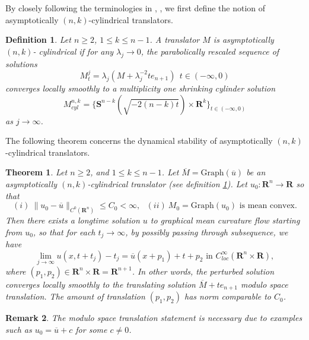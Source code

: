 \documentclass[pdflatex,sn-mathphys-num]{sn-jnl}%
\newtheorem{theorem}{Theorem}[section]
\newtheorem{definition}{Definition}[section]
\newtheorem{remark}[theorem]{Remark}
\begin{document}
By closely following the terminologies in \cite{Bamler2025-pdeodi}, \cite{Bamler2025-thclassification}, we first define the notion of asymptotically $(n,k)$-cylindrical translators.
\begin{definition}\label{def of asymptotically cylindrical translators.}
Let $n \geq 2$, $1 \leq k \leq n-1$. A translator $M$ is asymptotically $(n,k)$- cylindrical if for any $\lambda_j \to 0$, the parabolically rescaled sequence of solutions 
\begin{equation}
   M^{j}_t = \lambda_j (M + \lambda_j^{-2}te_{n+1}) \ \ t\in (-\infty, 0) 
\end{equation}
converges locally smoothly to a multiplicity one shrinking cylinder solution
\begin{equation}
    M^{n,k}_{cyl} = \{\mathbf{S}^{n-k}(\sqrt{-2(n-k)t}) \times \mathbf{R}^k\}_{t\in (-\infty, 0)}
\end{equation}
as $j \to \infty$.
\end{definition}
The following theorem concerns the dynamical stability of asymptotically $(n,k)$-cylindrical translators. 
\begin{theorem}\label{dynamical stability of cylindrical translators intro}
Let $n \geq 2$, and $1 \leq k \leq n-1$. Let $\overline{M} = \text{Graph}(\overline{u})$ be an asymptotically $(n,k)$-cylindrical translator (see definition \ref{def of asymptotically cylindrical translators.}). Let $u_0 : \mathbf{R}^n \to \mathbf{R}$ so that
\begin{equation}
    (i)\  \|u_0 - \overline{u}\|_{C^0(\mathbf{R}^n)} \leq C_0 < \infty, \ \ \ (ii)\  M_0 = \text{Graph}(u_0) \text{ is mean convex}.
\end{equation}
Then there exists a longtime solution $u$ to graphical mean curvature flow starting from $u_0$, so that for each $t_j \to \infty$, by possibly passing through subsequence, we have
\begin{equation}
    \lim_{j \to \infty}u(x, t +t_j) - t_j = \overline{u}(x + p_1)+t + p_2 \text{ in }C^{\infty}_{loc}(\mathbf{R}^n\times \mathbf{R}),
\end{equation}
where $(p_1, p_2) \in \mathbf{R}^n \times \mathbf{R} = \mathbf{R}^{n+1}$. In other words, the perturbed solution converges locally smoothly to the translating solution $\overline{M} + te_{n+1}$ modulo space translation. The amount of translation $(p_1, p_2)$ has norm comparable to $C_0$.
\end{theorem}
\begin{remark}
   The modulo space translation statement is necessary due to examples such as $u_0 = \overline{u} + c$ for some $c \neq 0$.
\end{remark}
\end{document}
